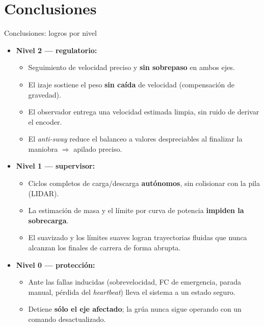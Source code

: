 \section{Conclusiones}

\begin{frame}{Conclusiones: logros por nivel}
  \small
  \begin{itemize}
    \item \textbf{Nivel 2 --- regulatorio:}
      \begin{itemize}
        \item Seguimiento de velocidad preciso y \textbf{sin sobrepaso} en ambos ejes.
        \item El izaje sostiene el peso \textbf{sin caída} de velocidad (compensación de gravedad).
        \item El observador entrega una velocidad estimada limpia, sin ruido de derivar el encoder.
        \item El \textit{anti-sway} reduce el balanceo a valores despreciables al finalizar la
              maniobra $\Rightarrow$ apilado preciso.
      \end{itemize}
    \item \textbf{Nivel 1 --- supervisor:}
      \begin{itemize}
        \item Ciclos completos de carga/descarga \textbf{autónomos}, sin colisionar con la pila
              (LIDAR).
        \item La estimación de masa y el límite por curva de potencia \textbf{impiden la sobrecarga}.
        \item El suavizado y los límites suaves logran trayectorias fluidas que nunca alcanzan los
              finales de carrera de forma abrupta.
      \end{itemize}
    \item \textbf{Nivel 0 --- protección:}
      \begin{itemize}
        \item Ante las fallas inducidas (sobrevelocidad, FC de emergencia, parada manual, pérdida
              del \textit{heartbeat}) lleva el sistema a un estado seguro.
        \item Detiene \textbf{sólo el eje afectado}; la grúa nunca sigue operando con un comando
              desactualizado.
      \end{itemize}
  \end{itemize}
\end{frame}


